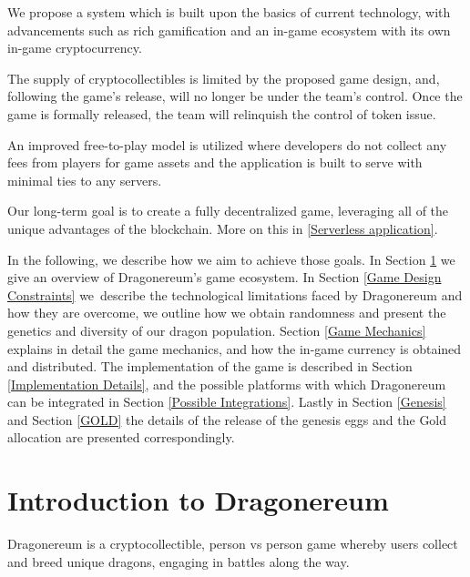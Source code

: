 \documentclass[12pt]{article}
\begin{document}
We propose a system which is built upon the basics of current technology, with advancements such as rich gamification and an in-game ecosystem with its own in-game cryptocurrency.\par

The supply of cryptocollectibles is limited by the proposed game design, and, following the game’s release, will no longer be under the team’s control. Once the game is formally released, the team will relinquish the control of token issue.\par

An improved free-to-play model is utilized where developers do not collect any fees from players for game assets and the application is built to serve with minimal ties to any servers.\par

Our long-term goal is to create a fully decentralized game, leveraging all of the unique advantages of the blockchain. More on this in \ref{Serverless application}.\par

In the following, we describe how we aim to achieve those goals. In Section \ref{Introduction to Dragonereum} we give an overview of Dragonereum’s game ecosystem. In Section \ref{Game Design Constraints} we\ describe the technological limitations faced by Dragonereum and how they are overcome, we outline how we obtain randomness and present the genetics and diversity of our dragon population.  Section \ref{Game Mechanics} explains in detail the game mechanics, and how the in-game currency is obtained and distributed. The implementation of the game is described in Section \ref{Implementation Details}, and the possible platforms with which Dragonereum can be integrated in Section \ref{Possible Integrations}. Lastly in Section \ref{Genesis} and Section \ref{GOLD} the details of the release of the genesis eggs and the Gold allocation are presented correspondingly.\par


\newpage
\vspace{\baselineskip}\section{Introduction to Dragonereum}
  \label{Introduction to Dragonereum}  \par

Dragonereum is a cryptocollectible, person vs person game whereby users collect and breed unique dragons, engaging in battles along the way.\par
\end{document}
